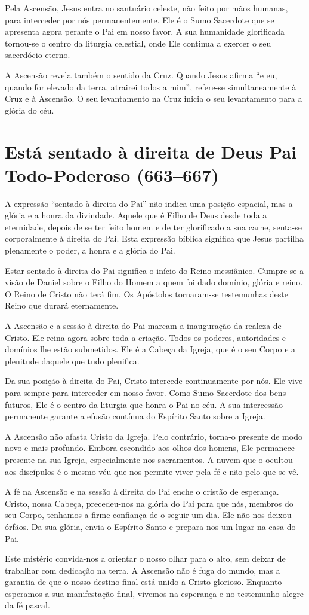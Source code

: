 Pela Ascensão, Jesus entra no santuário celeste, não feito por mãos humanas, para interceder por nós permanentemente. Ele é o Sumo Sacerdote que se apresenta agora perante o Pai em nosso favor. A sua humanidade glorificada tornou-se o centro da liturgia celestial, onde Ele continua a exercer o seu sacerdócio eterno.

A Ascensão revela também o sentido da Cruz. Quando Jesus afirma ``e eu, quando for elevado da terra, atrairei todos a mim'', refere-se simultaneamente à Cruz e à Ascensão. O seu levantamento na Cruz inicia o seu levantamento para a glória do céu.

\section{Está sentado à direita de Deus Pai Todo-Poderoso (663--667)}

A expressão ``sentado à direita do Pai'' não indica uma posição espacial, mas a glória e a honra da divindade. Aquele que é Filho de Deus desde toda a eternidade, depois de se ter feito homem e de ter glorificado a sua carne, senta-se corporalmente à direita do Pai. Esta expressão bíblica significa que Jesus partilha plenamente o poder, a honra e a glória do Pai.

Estar sentado à direita do Pai significa o início do Reino messiânico. Cumpre-se a visão de Daniel sobre o Filho do Homem a quem foi dado domínio, glória e reino. O Reino de Cristo não terá fim. Os Apóstolos tornaram-se testemunhas deste Reino que durará eternamente.

A Ascensão e a sessão à direita do Pai marcam a inauguração da realeza de Cristo. Ele reina agora sobre toda a criação. Todos os poderes, autoridades e domínios lhe estão submetidos. Ele é a Cabeça da Igreja, que é o seu Corpo e a plenitude daquele que tudo plenifica.

Da sua posição à direita do Pai, Cristo intercede continuamente por nós. Ele vive para sempre para interceder em nosso favor. Como Sumo Sacerdote dos bens futuros, Ele é o centro da liturgia que honra o Pai no céu. A sua intercessão permanente garante a efusão contínua do Espírito Santo sobre a Igreja.

A Ascensão não afasta Cristo da Igreja. Pelo contrário, torna-o presente de modo novo e mais profundo. Embora escondido aos olhos dos homens, Ele permanece presente na sua Igreja, especialmente nos sacramentos. A nuvem que o ocultou aos discípulos é o mesmo véu que nos permite viver pela fé e não pelo que se vê.

A fé na Ascensão e na sessão à direita do Pai enche o cristão de esperança. Cristo, nossa Cabeça, precedeu-nos na glória do Pai para que nós, membros do seu Corpo, tenhamos a firme confiança de o seguir um dia. Ele não nos deixou órfãos. Da sua glória, envia o Espírito Santo e prepara-nos um lugar na casa do Pai.

Este mistério convida-nos a orientar o nosso olhar para o alto, sem deixar de trabalhar com dedicação na terra. A Ascensão não é fuga do mundo, mas a garantia de que o nosso destino final está unido a Cristo glorioso. Enquanto esperamos a sua manifestação final, vivemos na esperança e no testemunho alegre da fé pascal.